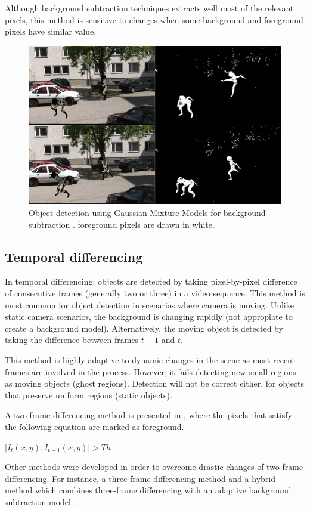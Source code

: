 Although background subtraction techniques extracts well most of the relevant
pixels, this method is sensitive to changes when some background and foreground
pixels have similar value.

\begin{figure}[h!]
	\centering
		\includegraphics[width=0.7\linewidth]{Figures/bg_sub.jpg}
	\caption{Object detection using Gaussian Mixture Models for background
	subtraction \cite{Pham2010}. foreground pixels are drawn in white.}
	\label{fig::bg_sub}
\end{figure}

\subsection{Temporal differencing}

In temporal differencing, objects are detected by taking pixel-by-pixel
difference of consecutive frames (generally two or three) in a video sequence.
This method is most common for object detection in scenarios where camera
is moving. Unlike static camera scenarios, the background is changing rapidly
(not appropiate to create a background model). Alternatively,
the moving object is detected by taking the difference between frames $t - 1$
and $t$.

This method is highly adaptive to dynamic changes in the scene as most recent
frames are involved in the process. However, it fails detecting new small
regions as moving objects (ghost regions). Detection will not be correct either,
for objects that preserve uniform regions (static objects).

A two-frame differencing method is presented in \cite{Lipton1998a}, where the
pixels that satisfy the following equation are marked as foreground.\\
\centerline{$|I_t(x,y), I_{t-1}(x,y)|>Th$}

Other methods were developed in order to overcome drastic changes of two frame differencing. For instance, a three-frame differencing method \cite{Wang2003} 
and a hybrid method which combines three-frame differencing with an adaptive
background subtraction model \cite{Collins2000}.

